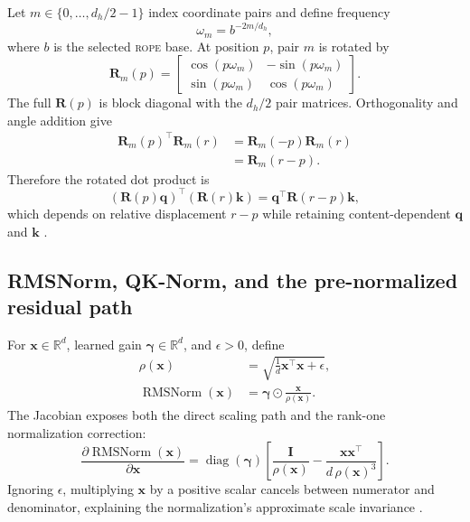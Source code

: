 \documentclass[10pt,letterpaper]{article}
\newcommand{\abbr}[1]{\textsc{\MakeLowercase{#1}}}
\newcommand{\R}{\mathbb{R}}
\newcommand{\1}{\mathbb{1}}
\newcommand{\vect}[1]{\bm{#1}}
\newcommand{\mat}[1]{\bm{#1}}
\newcommand{\diag}{\operatorname{diag}}
\begin{document}
Let $m\in\{0,\ldots,d_h/2-1\}$ index coordinate pairs and define frequency
\begin{equation}
  \omega_m=b^{-2m/d_h},
  \label{eq:rope-frequency}
\end{equation}
where $b$ is the selected \abbr{RoPE} base.  At position $p$, pair $m$ is rotated by
\begin{equation}
  \mat R_m(p)=
  \begin{bmatrix}
    \cos(p\omega_m)&-\sin(p\omega_m)\\
    \sin(p\omega_m)& \cos(p\omega_m)
  \end{bmatrix}.
  \label{eq:rope-pair}
\end{equation}
The full $\mat R(p)$ is block diagonal with the $d_h/2$ pair matrices.  Orthogonality and angle
addition give
\begin{align}
  \mat R_m(p)^\top\mat R_m(r)
  &=\mat R_m(-p)\mat R_m(r)\\
  &=\mat R_m(r-p).
\end{align}
Therefore the rotated dot product is
\begin{equation}
  (\mat R(p)\vect q)^\top(\mat R(r)\vect k)
  =\vect q^\top\mat R(r-p)\vect k,
  \label{eq:rope-relative}
\end{equation}
which depends on relative displacement $r-p$ while retaining content-dependent $\vect q$ and
$\vect k$ \cite{su2021roformer}.

\subsection{RMSNorm, QK-Norm, and the pre-normalized residual path}

For $\vect x\in\R^d$, learned gain $\vect\gamma\in\R^d$, and $\epsilon>0$, define
\begin{align}
  \rho(\vect x)&=\sqrt{\frac{1}{d}\vect x^\top\vect x+\epsilon},\\
  \operatorname{RMSNorm}(\vect x)
  &=\vect\gamma\odot\frac{\vect x}{\rho(\vect x)}.
  \label{eq:rmsnorm}
\end{align}
The Jacobian exposes both the direct scaling path and the rank-one normalization correction:
\begin{equation}
  \frac{\partial\operatorname{RMSNorm}(\vect x)}{\partial\vect x}
  =\diag(\vect\gamma)
   \left[
     \frac{\mat I}{\rho(\vect x)}
     -\frac{\vect x\vect x^\top}{d\,\rho(\vect x)^3}
   \right].
  \label{eq:rmsnorm-jacobian}
\end{equation}
Ignoring $\epsilon$, multiplying $\vect x$ by a positive scalar cancels between numerator and
denominator, explaining the normalization's approximate scale invariance \cite{zhang2019rmsnorm}.
\end{document}
